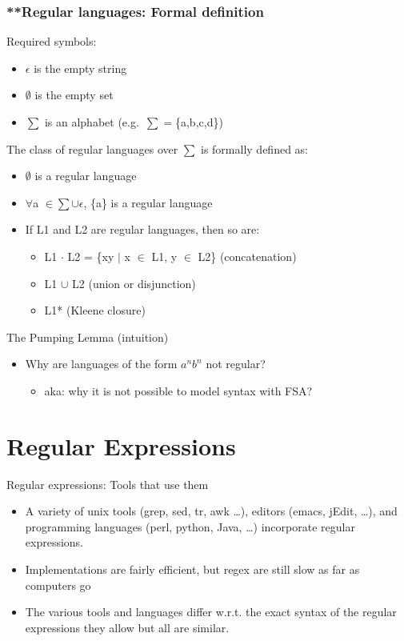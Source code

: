 \documentclass{beamer}
\begin{document}
\begin{frame}
\frametitle{**Regular languages: Formal definition}

Required symbols:

\begin{itemize}
\item $\epsilon$ is the empty string
\item $\emptyset$ is the empty set
\item $\sum$ is an alphabet (e.g.\ $\sum = $\{a,b,c,d\})
\end{itemize}

The class of regular languages over $\sum$ is formally defined as: 

\begin{itemize}
\item $\emptyset$  is a regular language
\item $\forall$a $\in \sum \cup \epsilon$, \{a\} is a regular language  
\item If L1 and L2 are regular languages, then so are:
\begin{itemize}
\item L1 $\cdot$ L2 = \{xy $\vert$ x $\in$ L1, y $\in$ L2\} (concatenation)
\item L1 $\cup$ L2 (union or disjunction)
\item L1* (Kleene closure)
\end{itemize}
\end{itemize}
\end{frame}


\begin{frame}{The Pumping Lemma (intuition)}
\begin{itemize}
\item Why are languages of the form $a^nb^n$ not regular?
  \begin{itemize}
  \item aka: why it is not possible to model syntax with FSA?
  \end{itemize}
\end{itemize}
\end{frame}

\section{Regular Expressions}


\begin{frame}{Regular expressions: Tools that use them}
  \begin{itemize}
  \item A variety of unix tools (grep, sed, tr, awk \ldots), editors
    (emacs, jEdit, \ldots), and programming languages (perl, python,
    Java, \ldots) incorporate regular expressions.
        
  \item Implementations are fairly efficient, but regex are still slow
    as far as computers go
    
  \item The various tools and languages differ w.r.t. the exact syntax
    of the regular expressions they allow but all are similar.
  \end{itemize}
\end{frame}
\end{document}
